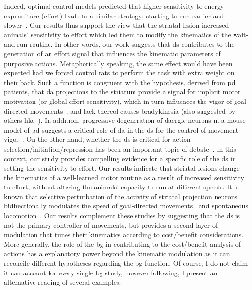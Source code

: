 Indeed, optimal control models predicted that higher sensitivity to energy expenditure (effort) leads to a similar strategy: starting to run earlier and slower~\cite{JuradoParras2020}.
Our results thus support the view that the striatal lesion increased animals' sensitivity to effort which led them to modify the kinematics of the wait-and-run routine.
In other words, our work suggests that \gls{ds} contributes to the generation of an effort signal that influences the kinematic parameters of purposive actions.
Metaphorically speaking, the same effect would have been expected had we forced control rats to perform the task with extra weight on their back.
Such a function is congruent with the hypothesis, derived from \gls{pd} patients, that \gls{da} projections to the striatum provide a signal for implicit motor motivation (or global effort sensitivity), which in turn influences the vigor of goal-directed movements~\cite{Mazzoni2007}, and lack thereof causes bradykinesia (also suggested by others like~\cite{Berke2018NN, Beeler2012Fron}).
In addition, progressive degeneration of \gls{da}ergic neurons in a mouse model of \gls{pd} suggests a critical role of \gls{da} in the \gls{ds} for the control of movement vigor~\cite{Panigrahi2015Cell}.
On the other hand, whether the \gls{ds} is critical for action selection/initiation/repression has been an important topic of debate~\cite{Turner2010CurrOpinNeurobiol, Dudman2016CurrOpinNeurobiol}. 
In this context, our study provides compelling evidence for a specific role of the \gls{ds} in setting the sensitivity to effort.
Our results indicate that striatal lesions change the kinematics of a well-learned motor routine as a result of increased sensitivity to effort, without altering the animals' capacity to run at different speeds.
It is known that selective perturbation of the activity of striatal projection neurons bidirectionally modulates the speed of goal-directed movements~\cite{Yttri2016Nature} and spontaneous locomotion~\cite{Kravitz2010Nature}. 
Our results complement these studies by suggesting that the \gls{ds} is not the primary controller of movements, but provides a second layer of modulation that tunes their kinematics according to cost/benefit considerations.
More generally, the role of the \gls{bg} in contributing to the cost/benefit analysis of actions has a explanatory power beyond the kinematic modulation as it can reconcile different hypotheses regarding the \gls{bg} function.
Of course, I do not claim it can account for every single \gls{bg} study, however following, I present an alternative reading of several examples:
